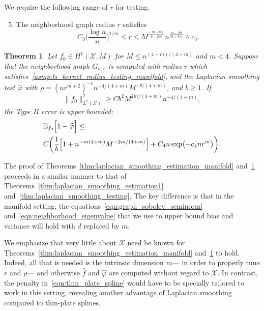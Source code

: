 \documentclass[twoside]{article}
\newcommand{\1}{\mathbf{1}}
\newcommand{\Xset}{\mathcal{X}}
\newcommand{\Leb}{L}
\newcommand{\Ebb}{\mathbb{E}}
\newcommand{\wh}[1]{\widehat{#1}}
\newtheorem{theorem}{Theorem}
\theoremstyle{definition}
\theoremstyle{remark}
\begin{document}
We require the following range of $r$ for testing.
\begin{enumerate}[label=(R\arabic*)]
	\setcounter{enumi}{4}
	\item 
	\label{asmp:ls_kernel_radius_testing_manifold}
	The neighborhood graph radius $r$ satisfies
	\begin{equation*}
	C_3\biggl(\frac{\log n}{n}\biggr)^{1/m} \leq r \leq M^{\frac{(m - 8)}{8 + 2m}}n^{\frac{m - 20}{32 + 8m}} \wedge c_3.
	\end{equation*}
\end{enumerate}

\begin{theorem}
	\label{thm:laplacian_smoothing_testing_manifold}
	Let $f_0 \in H^1(\Xset,M)$ for $M \leq n^{(4 - m)/(4 + m)}$ and $m < 4$. Suppose that the neighborhood graph $G_{n,r}$ is computed with radius $r$ which satisfies~\ref{asmp:ls_kernel_radius_testing_manifold}, and the Laplacian smoothing test $\wh{\varphi}$ with $\rho = (nr^{m + 2})^{-1} n^{-4/(4 + m)} M^{-8/(4 + m)}$, and $b \geq 1$. If
	\begin{equation}
	\label{eqn:laplacian_smoothing_testing_manifold}
	\bigl\|f_0\bigr\|_{\Leb^2(\Xset)}^2 \geq C b^2 M^{2m/(4 + m)} n^{-4/(4 + m)},
	\end{equation} 
	the Type II error is upper bounded:
	\begin{align*}
	& \Ebb_{f_0}\Bigl[1 - \wh{\varphi} \Bigr] \leq \\
	& C\biggl(\frac{1}{b}\Bigl[1 + n^{-m(4 + m)}M^{-2m/(4 + m)}\Bigr] + C_4n\exp\bigl(-c_4nr^m\bigr)\biggr).
	\end{align*}
\end{theorem}
The proof of Theorems~\ref{thm:laplacian_smoothing_estimation_manifold} and~\ref{thm:laplacian_smoothing_testing_manifold} proceeds in a similar manner to that of Theorems~\ref{thm:laplacian_smoothing_estimation1} and~\ref{thm:laplacian_smoothing_testing}. The key difference is that in the manifold setting, the equations~\eqref{eqn:graph_sobolev_seminorm} and~\eqref{eqn:neighborhood_eigenvalue} that we use to upper bound bias and variance will hold with $d$ replaced by $m$.

We emphasize that very little about $\Xset$ need be known for Theorems~\ref{thm:laplacian_smoothing_estimation_manifold} and~\ref{thm:laplacian_smoothing_testing_manifold} to hold. Indeed, all that is needed is the intrinsic dimension $m$--- in order to properly tune $r$ and $\rho$--- and otherwise $\wh{f}$ and $\wh{\varphi}$ are computed without regard to $\Xset$. In contrast, the penalty in~\eqref{eqn:thin_plate_spline} would have to be specially tailored to work in this setting, revealing another advantage of Laplacian smoothing compared to thin-plate splines.
\end{document}
